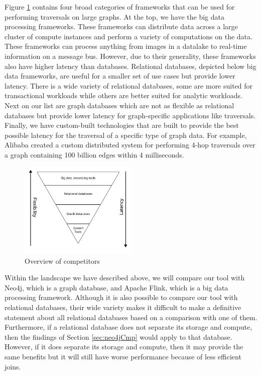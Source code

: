 \smallskip
Figure \ref{fig:competitorsOverview} contains four broad categories of
frameworks that can be used for performing traversals on large graphs. At the
top, we have the big data processing frameworks. These frameworks can distribute
data across a large cluster of compute instances and perform a variety of
computations on the data. These frameworks can process anything from images in a
datalake to real-time information on a message bus. However, due to their
generality, these frameworks also have higher latency than databases. Relational
databases, depicted below big data frameworks, are useful for a
smaller set of use cases but provide lower latency. There is a wide variety of
relational databases, some are more suited for transactional workloads while
others are better suited for analytic workloads. Next on our list are graph
databases which are not as flexible as relational databases but provide lower
latency for graph-specific applications like
traversals\cite{kotiranta2022performance}. Finally, we have custom-built
technologies that are built to provide the best possible latency for the traversal
of a specific type of graph data. For example, Alibaba created a custom
distributed system for performing 4-hop traversals over a graph containing 100
billion edges within 4 milliseconds\cite{sahu2017ubiquity}.
\begin{figure}[ht]
    \centering
    \includegraphics[width=0.5\textwidth]{figures/competitors}
    \caption{Overview of competitors}
    \label{fig:competitorsOverview}
\end{figure}

\smallskip
Within the landscape we have described above, we will compare our tool with
Neo4j, which is a graph database, and Apache Flink, which is a big data
processing framework. Although it is also possible to compare our tool with
relational databases, their wide variety makes it difficult to make a definitive
statement about all relational databases based on a comparison with one of them.
Furthermore, if a relational database does not separate its storage and compute,
then the findings of Section \ref{sec:neo4jCmp} would apply to that database.
However, if it does separate its storage and compute, then it may provide the
same benefits but it will still have worse performance because of less efficient
joins\cite{kotiranta2022performance}.

